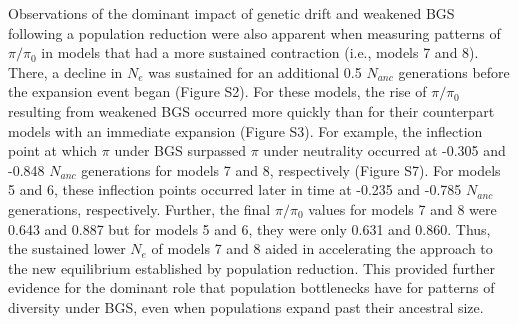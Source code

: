 \documentclass[9pt,twocolumn,twoside]{rilabRxiv}
\begin{document}

Observations of the dominant impact of genetic drift and weakened BGS
following a population reduction were also apparent when measuring
patterns of $\pi/\pi_0$ in models that had a more sustained
contraction (i.e., models 7 and 8). There, a decline in
$N_e$ was sustained for an additional 0.5
$N_{anc}$ generations before the expansion event began
(Figure S2). For these models, the rise of $\pi/\pi_0$
resulting from weakened BGS occurred more quickly than for their
counterpart models with an immediate expansion (Figure S3). For example,
the inflection point at which $\pi$ under BGS surpassed $\pi$ under neutrality
occurred at -0.305 and -0.848 $N_{anc}$ generations
for models 7 and 8, respectively (Figure S7). For models 5 and 6, these
inflection points occurred later in time at -0.235 and -0.785
$N_{anc}$ generations, respectively. Further, the
final $\pi/\pi_0$ values for models 7 and 8 were 0.643 and
0.887 but for models 5 and 6, they were only 0.631 and 0.860. Thus, the
sustained lower $N_e$ of models 7 and 8 aided in
accelerating the approach to the new equilibrium established by
population reduction. This provided further evidence for the dominant
role that population bottlenecks have for patterns of diversity under
BGS, even when populations expand past their ancestral size.
\end{document}
